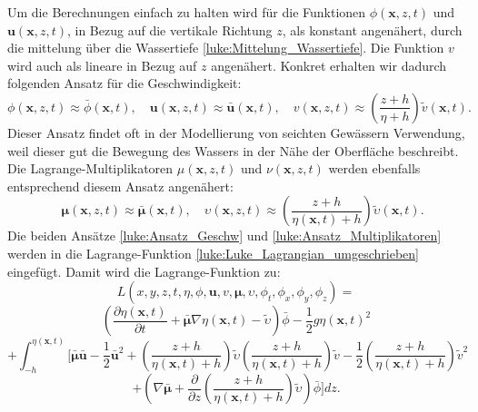 Um die Berechnungen einfach zu halten wird für die Funktionen $\phi (\bm{x},z,t)$ und $\bm{u} (\bm{x},z,t)$, in Bezug auf die vertikale Richtung $z$, als konstant angenähert, durch die mittelung über die Wassertiefe \eqref{luke:Mittelung_Wassertiefe}.
Die Funktion $v$ wird auch als lineare in Bezug auf $z$ angenähert. 
Konkret erhalten wir dadurch folgenden Ansatz für die Geschwindigkeit:
\begin{equation}
	\phi(\bm{x},z,t) \approx \bar{\phi}(\bm{x}, t), \quad \bm{u}(\bm{x},z,t) \approx \bar{\bm{u}}(\bm{x}, t), \quad v(\bm{x},z,t) \approx \left(\frac{z + h}{\eta + h}\right) \tilde{v}(\bm{x}, t).
	\label{luke:Ansatz_Geschw}
\end{equation}
Dieser Ansatz findet oft in der Modellierung von seichten Gewässern Verwendung, weil dieser gut die Bewegung des Wassers in der Nähe der Oberfläche beschreibt.
Die Lagrange-Multiplikatoren $\mu(\bm{x},z,t)$ und $\nu(\bm{x},z,t)$ werden ebenfalls entsprechend diesem Ansatz angenähert:
\begin{equation}
	\quad \bm{\mu}(\bm{x},z,t) \approx \bar{\bm{\mu}}(\bm{x}, t), \quad \upsilon(\bm{x},z,t) \approx \left(\frac{z + h}{\eta(\bm{x}, t) + h}\right)\tilde{\upsilon}(\bm{x}, t).
	\label{luke:Ansatz_Multiplikatoren}
\end{equation}
Die beiden Ansätze \eqref{luke:Ansatz_Geschw} und \eqref{luke:Ansatz_Multiplikatoren} werden in die Lagrange-Funktion \eqref{luke:Luke_Lagrangian_umgeschrieben} eingefügt.
Damit wird die Lagrange-Funktion zu:
\[
L(x,y,z,t,\eta,\phi,\bm{u}, v, \bm{\mu},\upsilon,\phi_t,\phi_x,\phi_y,\phi_z)
=
\]
\[
\left(\frac{\partial \eta(\bm{x}, t)}{\partial t}
+
\bar{\bm{\mu}}  \nabla \eta(\bm{x}, t)
-
\widetilde{\upsilon}\right) \bar{\phi}
-
\frac{1}{2} g \eta(\bm{x}, t)^2
\]
\[
+
\int_{-h}^{\eta(\bm{x}, t)} \Bigg[ \bar{\bm{\mu}}  \bar{\bm{u}} - \frac{1}{2} \bar{\bm{u}}^2 +\left(\frac{z + h}{\eta(\bm{x}, t) + h}\right)\tilde{\upsilon} \left(\frac{z + h}{\eta(\bm{x}, t) + h}\right)\tilde{v} - \frac{1}{2} \left(\frac{z + h}{\eta(\bm{x}, t) + h}\right)\tilde{v}^2 
\]
\[
+\left(\nabla \bar{\bm{\mu}} + \frac{\partial}{\partial z} \left(\frac{z + h}{\eta(\bm{x}, t) + h}\right)\tilde{\upsilon}\right) \bar{\phi} \Bigg] dz.
\]

